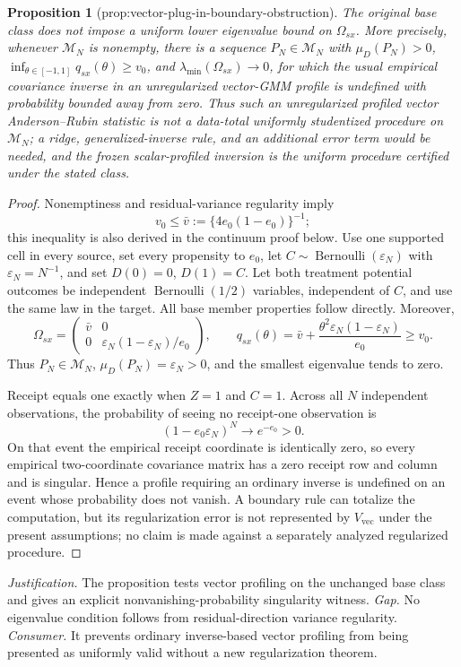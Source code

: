 \documentclass{article}
\newtheorem{proposition}{Proposition}
\begin{document}
\begin{proposition}[prop:vector-plug-in-boundary-obstruction]\label{prop:vector-plug-in-boundary-obstruction}
The original base class does not impose a uniform lower eigenvalue bound on \(\Omega_{sx}\). More precisely, whenever \(\mathcal M_N\) is nonempty, there is a sequence \(P_N\in\mathcal M_N\) with \(\mu_D(P_N)>0\), \(\inf_{\theta\in[-1,1]}q_{sx}(\theta)\ge v_0\), and \(\lambda_{\min}(\Omega_{sx})\to0\), for which the usual empirical covariance inverse in an unregularized vector-GMM profile is undefined with probability bounded away from zero. Thus such an unregularized profiled vector Anderson--Rubin statistic is not a data-total uniformly studentized procedure on \(\mathcal M_N\); a ridge, generalized-inverse rule, and an additional error term would be needed, and the frozen scalar-profiled inversion is the uniform procedure certified under the stated class.
\end{proposition}
\begin{proof}
Nonemptiness and residual-variance regularity imply
\[
v_0\le \bar v:=\{4e_0(1-e_0)\}^{-1};
\]
this inequality is also derived in the continuum proof below. Use one supported cell in every source, set every propensity to \(e_0\), let \(C\sim\operatorname{Bernoulli}(\varepsilon_N)\) with \(\varepsilon_N=N^{-1}\), and set \(D(0)=0\), \(D(1)=C\). Let both treatment potential outcomes be independent \(\operatorname{Bernoulli}(1/2)\) variables, independent of \(C\), and use the same law in the target. All base member properties follow directly. Moreover,
\[
\Omega_{sx}=
\begin{pmatrix}
\bar v&0\\[2pt]
0&\varepsilon_N(1-\varepsilon_N)/e_0
\end{pmatrix},
\qquad
q_{sx}(\theta)=\bar v+\frac{\theta^2\varepsilon_N(1-\varepsilon_N)}{e_0}\ge v_0.
\]
Thus \(P_N\in\mathcal M_N\), \(\mu_D(P_N)=\varepsilon_N>0\), and the smallest eigenvalue tends to zero.

Receipt equals one exactly when \(Z=1\) and \(C=1\). Across all \(N\) independent observations, the probability of seeing no receipt-one observation is
\[
(1-e_0\varepsilon_N)^N\longrightarrow e^{-e_0}>0.
\]
On that event the empirical receipt coordinate is identically zero, so every empirical two-coordinate covariance matrix has a zero receipt row and column and is singular. Hence a profile requiring an ordinary inverse is undefined on an event whose probability does not vanish. A boundary rule can totalize the computation, but its regularization error is not represented by \(V_{\mathrm{vec}}\) under the present assumptions; no claim is made against a separately analyzed regularized procedure.
\end{proof}
\par\smallskip\noindent \textit{Justification.} The proposition tests vector profiling on the unchanged base class and gives an explicit nonvanishing-probability singularity witness. \textit{Gap.} No eigenvalue condition follows from residual-direction variance regularity. \textit{Consumer.} It prevents ordinary inverse-based vector profiling from being presented as uniformly valid without a new regularization theorem.
\end{document}
